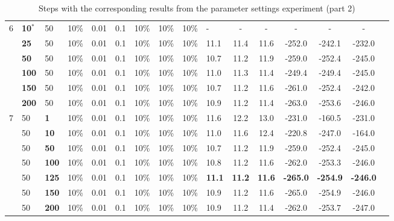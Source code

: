 \begin{sidewaystable}
\begin{tabular}{|l|l|l|l|l|l|l|l|l|l||c|c|c|c|c|c|}
    \hline
    6 & \textbf{10$^*$} & 50 & 10\% & 0.01 & 0.1 & 10\% & 10\% & 10\% & - & - & - & - & - & - \\
    ~ & \textbf{25} & 50 & 10\% & 0.01 & 0.1 & 10\% & 10\% & 10\% & 11.1 & 11.4 & 11.6 & -252.0 & -242.1 & -232.0 \\
    ~ & \textbf{50} & 50 & 10\% & 0.01 & 0.1 & 10\% & 10\% & 10\% & 10.7 & 11.2 & 11.9 & -259.0 & -252.4 & -245.0 \\
    ~ & \textbf{100} & 50 & 10\% & 0.01 & 0.1 & 10\% & 10\% & 10\% & 11.0 & 11.3 & 11.4 & -249.4 & -249.4 & -245.0 \\
    ~ & \textbf{150} & 50 & 10\% & 0.01 & 0.1 & 10\% & 10\% & 10\% & 10.7 & 11.2 & 11.6 & -261.0 & -252.4 & -242.0 \\
    ~ & \textbf{200} & 50 & 10\% & 0.01 & 0.1 & 10\% & 10\% & 10\% & 10.9 & 11.2 & 11.4 & -263.0 & -253.6 & -246.0 \\
    \hline
    7 & 50 & \textbf{1} & 10\% & 0.01 & 0.1 & 10\% & 10\% & 10\% & 11.6 & 12.2 & 13.0 & -231.0 & -160.5 & -231.0  \\
    ~ & 50 & \textbf{10} & 10\% & 0.01 & 0.1 & 10\% & 10\% & 10\% & 11.0 & 11.6 & 12.4 & -220.8 & -247.0 & -164.0  \\
    ~ & 50 & \textbf{50} & 10\% & 0.01 & 0.1 & 10\% & 10\% & 10\% & 10.7 & 11.2 & 11.9 & -259.0 & -252.4 & -245.0 \\
    ~ & 50 & \textbf{100} & 10\% & 0.01 & 0.1 & 10\% & 10\% & 10\% & 10.8 & 11.2 & 11.6 & -262.0 & -253.3 & -246.0  \\
    ~ & 50 & \textbf{125} & 10\% & 0.01 & 0.1 & 10\% & 10\% & 10\% & \textbf{11.1} & \textbf{11.2} & \textbf{11.6} & \textbf{-265.0} & \textbf{-254.9} & \textbf{-246.0}  \\
    ~ & 50 & \textbf{150} & 10\% & 0.01 & 0.1 & 10\% & 10\% & 10\% & 10.9 & 11.2 & 11.6 & -265.0 & -254.9 & -246.0  \\
    ~ & 50 & \textbf{200} & 10\% & 0.01 & 0.1 & 10\% & 10\% & 10\% & 10.9 & 11.2 & 11.4 & -262.0 & -253.7 & -247.0  \\
    \hline
    \end{tabular}
    \caption {Steps with the corresponding results from the parameter settings experiment (part 2)}
    \tiny

\end{sidewaystable}
